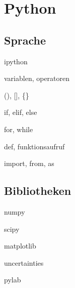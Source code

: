 \documentclass{beamer}
\begin{document}
  \section{Python}
    \begin{frame}
    \end{frame}
    \subsection{Sprache}
      \begin{frame}{ipython}
      \end{frame}
      \begin{frame}{variablen, operatoren}
      \end{frame}
      \begin{frame}{(), [], \{\}}
      \end{frame}
      \begin{frame}{if, elif, else}
      \end{frame}
      \begin{frame}{for, while}
      \end{frame}
      \begin{frame}{def, funktionsaufruf}
      \end{frame}
      \begin{frame}{import, from, as}
      \end{frame}
    \subsection{Bibliotheken}
      \begin{frame}{numpy}
      \end{frame}
      \begin{frame}{scipy}
      \end{frame}
      \begin{frame}{matplotlib}
      \end{frame}
      \begin{frame}{uncertainties}
      \end{frame}
      \begin{frame}{pylab}
      \end{frame}
\end{document}

